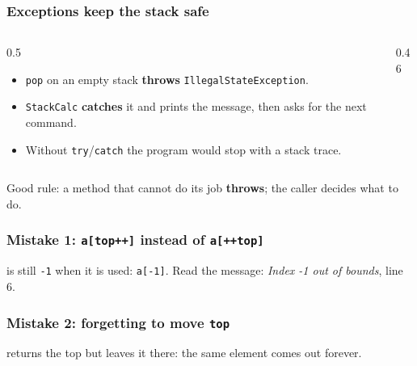 \documentclass[aspectratio=169,10pt,compress]{beamer}
\begin{document}
\begin{frame}[t,fragile] \frametitle{Exceptions keep the stack safe}
  \begin{columns}[T]
    \begin{column}{0.5\textwidth}
      \begin{itemize}\small
        \item \texttt{pop} on an empty stack \textbf{throws} \texttt{IllegalStateException}.
        \item \texttt{StackCalc} \textbf{catches} it and prints the message, then asks for the next command.
        \item Without \texttt{try}/\texttt{catch} the program would stop with a stack trace.
      \end{itemize}
    \end{column}
    \begin{column}{0.46\textwidth}
    \end{column}
  \end{columns}
  \vspace{0.5em}
  \small Good rule: a method that cannot do its job \textbf{throws}; the caller decides what to do.
\end{frame}





\begin{frame}[t,fragile] \frametitle{Mistake 1: \texttt{a[top++]} instead of \texttt{a[++top]}}

  \vspace{0.2em}
  \small {} is still \texttt{-1} when it is used: \texttt{a[-1]}. Read the message: \emph{Index -1 out of bounds}, line 6.
\end{frame}




\begin{frame}[t,fragile] \frametitle{Mistake 2: forgetting to move \texttt{top}}

  \vspace{0.2em}
  \small {} returns the top but leaves it there: the same element comes out forever.
\end{frame}
\end{document}
